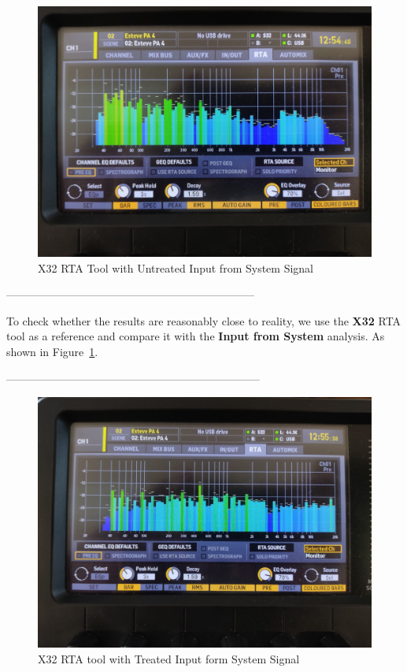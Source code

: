 \begin{figure}[H]
	\centering
	\includegraphics[width=0.8
	\linewidth]{Figures/Coro_X32_nontreated.jpeg}
	\caption{X32 RTA Tool with Untreated Input from System Signal}
	\label{fig:Coro_X32_nontreated}
\end{figure}
--------------------------------------------------------------------

To check whether the results are reasonably close to reality, we use the \textbf{X32} RTA tool as a reference and compare it with the \textbf{Input from System} analysis. As shown in Figure~\ref{fig:Coro_X32_nontreated}.

---------------------------------------------------------------------

\begin{figure}[H]
	\centering
	\includegraphics[width=0.8
	\linewidth]{Figures/Coro_X32_treatedRTAc.jpeg}
	\caption{X32 RTA tool with Treated Input form System Signal}
	\label{fig:Coro_X32_RTA+C}
\end{figure}

